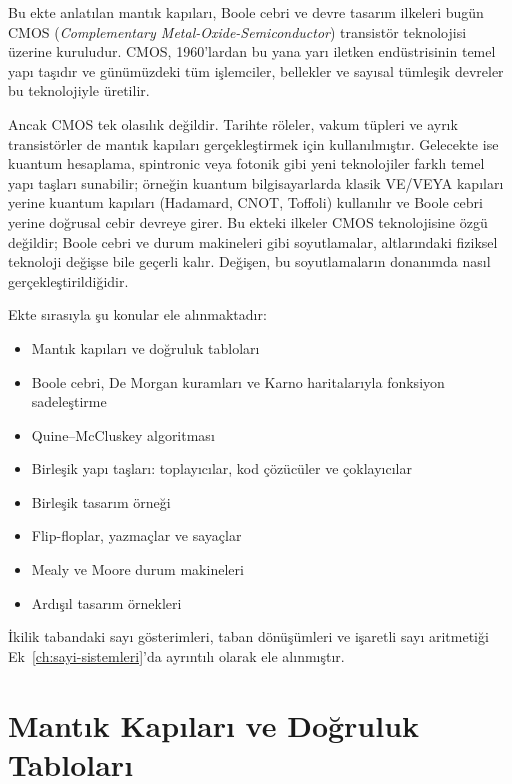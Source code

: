 \begin{bilginot}
Bu ekte anlatılan mantık kapıları, Boole cebri ve devre tasarım ilkeleri bugün CMOS (\emph{Complementary Metal-Oxide-Semiconductor}) transistör teknolojisi üzerine kuruludur. CMOS, 1960'lardan bu yana yarı iletken endüstrisinin temel yapı taşıdır ve günümüzdeki tüm işlemciler, bellekler ve sayısal tümleşik devreler bu teknolojiyle üretilir.

Ancak CMOS tek olasılık değildir. Tarihte röleler, vakum tüpleri ve ayrık transistörler de mantık kapıları gerçekleştirmek için kullanılmıştır. Gelecekte ise kuantum hesaplama, spintronic veya fotonik gibi yeni teknolojiler farklı temel yapı taşları sunabilir; örneğin kuantum bilgisayarlarda klasik VE/VEYA kapıları yerine kuantum kapıları (Hadamard, CNOT, Toffoli) kullanılır ve Boole cebri yerine doğrusal cebir devreye girer. Bu ekteki ilkeler CMOS teknolojisine özgü değildir; Boole cebri ve durum makineleri gibi soyutlamalar, altlarındaki fiziksel teknoloji değişse bile geçerli kalır. Değişen, bu soyutlamaların donanımda nasıl gerçekleştirildiğidir.
\end{bilginot}

Ekte sırasıyla şu konular ele alınmaktadır:

\begin{itemize}[nosep]
    \item Mantık kapıları ve doğruluk tabloları
    \item Boole cebri, De Morgan kuramları ve Karno haritalarıyla fonksiyon sadeleştirme
    \item Quine--McCluskey algoritması
    \item Birleşik yapı taşları: toplayıcılar, kod çözücüler ve çoklayıcılar
    \item Birleşik tasarım örneği
    \item Flip-floplar, yazmaçlar ve sayaçlar
    \item Mealy ve Moore durum makineleri
    \item Ardışıl tasarım örnekleri
\end{itemize}

\noindent İkilik tabandaki sayı gösterimleri, taban dönüşümleri ve işaretli sayı aritmetiği Ek~\ref{ch:sayi-sistemleri}'da ayrıntılı olarak ele alınmıştır.


\section{Mantık Kapıları ve Doğruluk Tabloları}

